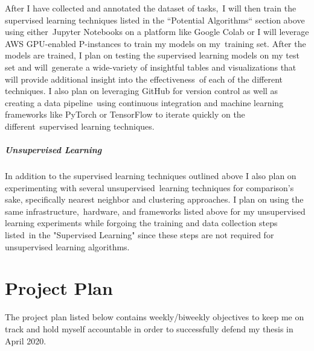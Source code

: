 \documentclass[letterpaper,12pt]{article}
\begin{document}
After I have collected and annotated the dataset of tasks,\
I will then train the supervised learning techniques listed in the ``Potential Algorithms`` section above using either\
Jupyter Notebooks on a platform like Google Colab or I will leverage AWS GPU-enabled P-instances to train my models on my\
training set. After the models are trained, I plan on testing the supervised learning models on my test set and will\
generate a wide-variety of insightful tables and visualizations that will provide additional insight into the effectiveness\
of each of the different techniques. I also plan on leveraging GitHub for version control as well as creating a data pipeline\
using continuous integration and machine learning frameworks like PyTorch or TensorFlow to iterate quickly on the different\
supervised learning techniques.

\paragraph{Unsupervised Learning}
In addition to the supervised learning techniques outlined above I also plan on experimenting with several unsupervised\
learning techniques for comparison's sake, specifically nearest neighbor and clustering approaches. I plan on using the same infrastructure,\
hardware, and frameworks listed above for my unsupervised learning experiments while forgoing the training and data collection steps listed\
in the "Supervised Learning" since these steps are not required for unsupervised learning algorithms.
\chapter{Project Plan}
The project plan listed below contains weekly/biweekly objectives to keep me on track and hold myself accountable in order
to successfully defend my thesis in April 2020.
\end{document}
